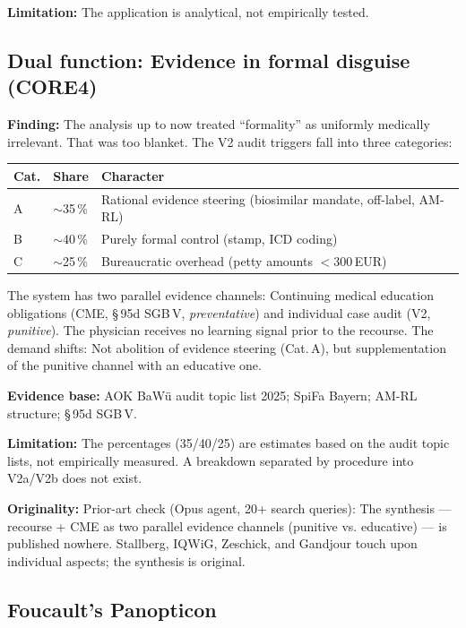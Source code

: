 \documentclass{umbruch-position}
\begin{document}
\textbf{Limitation:} The application is analytical, not empirically tested.

\subsection{Dual function: Evidence in formal disguise (CORE4)}

\textbf{Finding:} The analysis up to now treated ``formality'' as uniformly medically irrelevant. That was too blanket. The V2 audit triggers fall into three categories:

\smallskip
{\small
\begin{tabularx}{\textwidth}{l l X}
\hline
\textbf{Cat.} & \textbf{Share} & \textbf{Character} \\
\hline
A & ${\sim}$35\,\% & Rational evidence steering (biosimilar mandate, off-label, AM-RL) \\
B & ${\sim}$40\,\% & Purely formal control (stamp, ICD coding) \\
C & ${\sim}$25\,\% & Bureaucratic overhead (petty amounts ${<}$300\,EUR) \\
\hline
\end{tabularx}
}
\smallskip

The system has two parallel evidence channels: Continuing medical education obligations (CME, \S\,95d SGB\,V, \textit{preventative}) and individual case audit (V2, \textit{punitive}). The physician receives no learning signal prior to the recourse. The demand shifts: Not abolition of evidence steering (Cat.\,A), but supplementation of the punitive channel with an educative one.

\textbf{Evidence base:} AOK BaW\"u audit topic list 2025; SpiFa Bayern; AM-RL structure; \S\,95d SGB\,V.

\textbf{Limitation:} The percentages (35/40/25) are estimates based on the audit topic lists, not empirically measured. A breakdown separated by procedure into V2a/V2b does not exist.

\textbf{Originality:} Prior-art check (Opus agent, 20+ search queries): The synthesis --- recourse + CME as two parallel evidence channels (punitive vs. educative) --- is published nowhere. Stallberg, IQWiG, Zeschick, and Gandjour touch upon individual aspects; the synthesis is original.

\subsection{Foucault's Panopticon}
\end{document}

